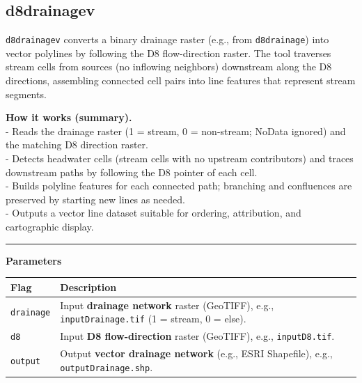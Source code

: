 \documentclass[
]{book}
\begin{document}
\subsection{d8drainagev}\label{d8drainagev}

\texttt{d8drainagev} converts a binary drainage raster (e.g., from \texttt{d8drainage}) into vector polylines by following the D8 flow-direction raster. The tool traverses stream cells from sources (no inflowing neighbors) downstream along the D8 directions, assembling connected cell pairs into line features that represent stream segments.

\textbf{How it works (summary).}\\
- Reads the drainage raster (1 = stream, 0 = non-stream; NoData ignored) and the matching D8 direction raster.\\
- Detects headwater cells (stream cells with no upstream contributors) and traces downstream paths by following the D8 pointer of each cell.\\
- Builds polyline features for each connected path; branching and confluences are preserved by starting new lines as needed.\\
- Outputs a vector line dataset suitable for ordering, attribution, and cartographic display.

\begin{center}\rule{0.5\linewidth}{0.5pt}\end{center}

\textbf{Parameters}

\begin{longtable}[]{@{}
  >{\raggedright\arraybackslash}p{}
  >{\raggedright\arraybackslash}p{}@{}}
\toprule\noalign{}
\begin{minipage}[b]{\linewidth}\raggedright
Flag
\end{minipage} & \begin{minipage}[b]{\linewidth}\raggedright
Description
\end{minipage} \\
\midrule\noalign{}
\endhead
\bottomrule\noalign{}
\endlastfoot
\texttt{drainage} & Input \textbf{drainage network} raster (GeoTIFF), e.g., \texttt{inputDrainage.tif} (1 = stream, 0 = else). \\
\texttt{d8} & Input \textbf{D8 flow-direction} raster (GeoTIFF), e.g., \texttt{inputD8.tif}. \\
\texttt{output} & Output \textbf{vector drainage network} (e.g., ESRI Shapefile), e.g., \texttt{outputDrainage.shp}. \\
\end{longtable}
\end{document}
